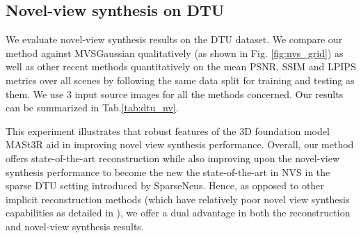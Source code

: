 \subsection{Novel-view synthesis on DTU}
\vspace{-5pt}
We evaluate novel-view synthesis results on the DTU \cite{aanaes2016large} dataset. We compare our method against 
MVSGaussian \cite{liu2024fast} qualitatively (as shown in Fig. \ref{fig:nvs_grid}) as well as other
recent methods quantitatively on the mean PSNR, SSIM and LPIPS metrics over all scenes by following the same data split for training and testing as them. We use $3$ input source images for all the methods concerned. Our results can be summarized in Tab.\ref{tab:dtu_nv}.
\begin{table}[t]
\centering
\setlength{\tabcolsep}{5pt}
\caption{Quantitative results of NVS generalization on the DTU test set. The best result is \textbf{bold}, and the second-best is \underline{underlined}.}
\label{tab:dtu_nv}
\end{table}
This experiment illustrates that robust features of the $3$D foundation model MASt3R aid in improving novel view synthesis performance. Overall, our method offers state-of-the-art reconstruction while also improving upon the novel-view synthesis performance to become the new the state-of-the-art in NVS in the sparse DTU setting introduced by SparseNeus\cite{long2022sparseneus}. Hence, as opposed to other implicit reconstruction methods \cite{long2022sparseneus, ren2023volrecon, liang2024retr} (which have relatively poor novel view synthesis capabilities as detailed in \cite{jena2024geotransfer}), we offer a dual advantage in both the reconstruction and novel-view synthesis results.




